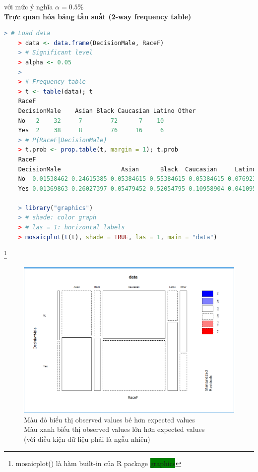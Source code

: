 \documentclass[a4paper,12pt]{article}
\begin{document}
	với mức ý nghĩa $\alpha = 0.5\%$\\
	
	\textbf{Trực quan hóa bảng tần suất (2-way frequency table)}
	
	\begin{lstlisting}[language=R]
	> # Load data
	> data <- data.frame(DecisionMale, RaceF)
	> # Significant level
	> alpha <- 0.05
	> 
	> # Frequency table
	> t <- table(data); t
	RaceF
	DecisionMale    Asian Black Caucasian Latino Other
	No   2    32     7        72      7    10
	Yes  2    38     8        76     16     6
	> # P(RaceF|DecisionMale)
	> t.prob <- prop.table(t, margin = 1); t.prob
	RaceF
	DecisionMale                 Asian      Black  Caucasian     Latino      Other
	No  0.01538462 0.24615385 0.05384615 0.55384615 0.05384615 0.07692308
	Yes 0.01369863 0.26027397 0.05479452 0.52054795 0.10958904 0.04109589
	
	> library("graphics")
	> # shade: color graph
	> # las = 1: horizontal labels
	> mosaicplot(t(t), shade = TRUE, las = 1, main = "data")
	\end{lstlisting}
	\footnote{mosaicplot() là hàm built-in của R package \colorbox{green}{graphics}}
	
	\begin{figure}[H]
		\centering
		\includegraphics[width=1.0\linewidth]{barchart}
		\caption{Màu đỏ biểu thị observed values bé hơn expected values\\ Màu xanh biểu thị observed values lớn hơn expected values\\ (với điều kiện dữ liệu phải là ngẫu nhiên)}
		\label{fig:barchart}
	\end{figure}
	
\end{document}

